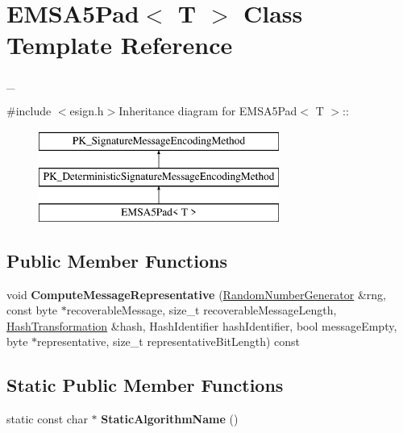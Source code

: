 \hypertarget{class_e_m_s_a5_pad}{
\section{EMSA5Pad$<$ T $>$ Class Template Reference}
\label{class_e_m_s_a5_pad}
}


\_\-  


{\ttfamily \#include $<$esign.h$>$}Inheritance diagram for EMSA5Pad$<$ T $>$::\begin{figure}[H]
\begin{center}
\leavevmode
\includegraphics[height=3cm]{class_e_m_s_a5_pad}
\end{center}
\end{figure}
\subsection*{Public Member Functions}
\begin{DoxyCompactItemize}
\item 
\hypertarget{class_e_m_s_a5_pad_ab486fe1d6e3fc8907fa9047e4f9f091b}{
void {\bfseries ComputeMessageRepresentative} (\hyperlink{class_random_number_generator}{RandomNumberGenerator} \&rng, const byte $\ast$recoverableMessage, size\_\-t recoverableMessageLength, \hyperlink{class_hash_transformation}{HashTransformation} \&hash, HashIdentifier hashIdentifier, bool messageEmpty, byte $\ast$representative, size\_\-t representativeBitLength) const }
\label{class_e_m_s_a5_pad_ab486fe1d6e3fc8907fa9047e4f9f091b}

\end{DoxyCompactItemize}
\subsection*{Static Public Member Functions}
\begin{DoxyCompactItemize}
\item 
\hypertarget{class_e_m_s_a5_pad_a72d577a96e0fb8a0783f824e6fc06162}{
static const char $\ast$ {\bfseries StaticAlgorithmName} ()}
\label{class_e_m_s_a5_pad_a72d577a96e0fb8a0783f824e6fc06162}

\end{DoxyCompactItemize}


